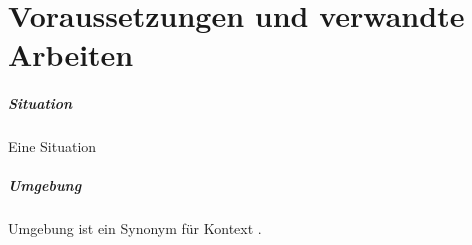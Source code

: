 \chapter{Voraussetzungen und verwandte Arbeiten}
\label{cha:requirements_and_related_work}





\paragraph{Situation}
Eine Situation 
\paragraph{Umgebung}
Umgebung ist ein Synonym für Kontext \cite{abowd_towards_1999}.


